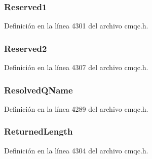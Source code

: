 \subsubsection[{Reserved1}]{ Reserved1}\label{structtag_m_q_g_m_o_a9a6d7674e570f3815495c51129f3828e}


Definición en la línea 4301 del archivo cmqc.\+h.

\hypertarget{structtag_m_q_g_m_o_a13f52935f43840169890b9beeaf233d5}{}
\subsubsection[{Reserved2}]{ Reserved2}\label{structtag_m_q_g_m_o_a13f52935f43840169890b9beeaf233d5}


Definición en la línea 4307 del archivo cmqc.\+h.

\hypertarget{structtag_m_q_g_m_o_aec4a06d696b4370f0c86b129d9f868ca}{}
\subsubsection[{Resolved\+Q\+Name}]{ Resolved\+Q\+Name}\label{structtag_m_q_g_m_o_aec4a06d696b4370f0c86b129d9f868ca}


Definición en la línea 4289 del archivo cmqc.\+h.

\hypertarget{structtag_m_q_g_m_o_a24c9ed4498ed0e5859f572f4c29392a4}{}
\subsubsection[{Returned\+Length}]{ Returned\+Length}\label{structtag_m_q_g_m_o_a24c9ed4498ed0e5859f572f4c29392a4}


Definición en la línea 4304 del archivo cmqc.\+h.

\hypertarget{structtag_m_q_g_m_o_a2fe04c63168add18793c3328bd6eb373}{}
